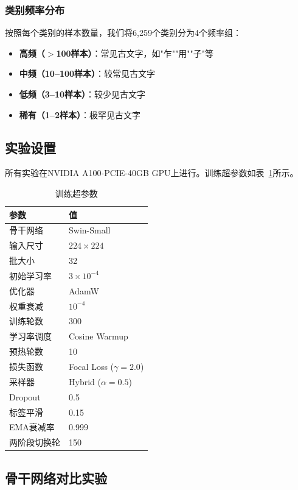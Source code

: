 \documentclass[12pt,a4paper]{article}
\begin{document}
\subsubsection{类别频率分布}

按照每个类别的样本数量，我们将6,259个类别分为4个频率组：
\begin{itemize}
    \item \textbf{高频（$>$100样本）}：常见古文字，如"乍""用""子"等
    \item \textbf{中频（10--100样本）}：较常见古文字
    \item \textbf{低频（3--10样本）}：较少见古文字
    \item \textbf{稀有（1--2样本）}：极罕见古文字
\end{itemize}

\subsection{实验设置}

所有实验在NVIDIA A100-PCIE-40GB GPU上进行。训练超参数如表~\ref{tab:hyperparams}所示。

\begin{table}[H]
\centering
\caption{训练超参数}
\label{tab:hyperparams}
\begin{tabular}{ll}
\toprule
\textbf{参数} & \textbf{值} \\
\midrule
骨干网络 & Swin-Small \\
输入尺寸 & $224 \times 224$ \\
批大小 & 32 \\
初始学习率 & $3 \times 10^{-4}$ \\
优化器 & AdamW \\
权重衰减 & $10^{-4}$ \\
训练轮数 & 300 \\
学习率调度 & Cosine Warmup \\
预热轮数 & 10 \\
损失函数 & Focal Loss ($\gamma=2.0$) \\
采样器 & Hybrid ($\alpha=0.5$) \\
Dropout & 0.5 \\
标签平滑 & 0.15 \\
EMA衰减率 & 0.999 \\
两阶段切换轮 & 150 \\
\bottomrule
\end{tabular}
\end{table}

\subsection{骨干网络对比实验}
\end{document}
